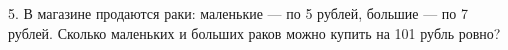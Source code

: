 5. В магазине продаются раки: маленькие --- по 5 рублей, большие --- по 7 рублей. Сколько маленьких и больших раков можно купить на 101 рубль ровно?\\
